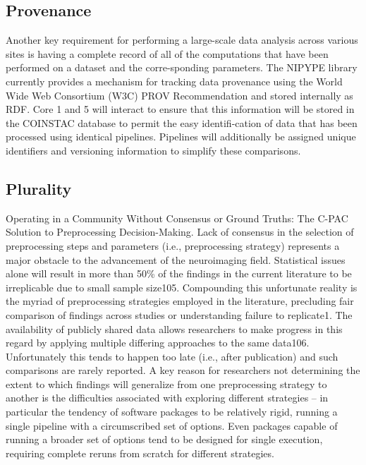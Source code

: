 \subsection{Provenance}
Another key requirement for performing a large-scale data analysis across various sites is having a complete record of all of the computations that have been performed on a dataset and the corre-sponding parameters. The NIPYPE library currently provides a mechanism for tracking data provenance using the World Wide Web Consortium (W3C) PROV Recommendation and stored internally as RDF. Core 1 and 5 will interact to ensure that this information will be stored in the COINSTAC database to permit the easy identifi-cation of data that has been processed using identical pipelines. Pipelines will additionally be assigned unique identifiers and versioning information to simplify these comparisons.



\subsection{Plurality}
\label{plurality}
Operating in a Community Without Consensus or Ground Truths: The C-PAC Solution to Preprocessing Decision-Making. Lack of consensus in the selection of preprocessing steps and parameters (i.e., preprocessing strategy) represents a major obstacle to the advancement of the neuroimaging field. Statistical issues alone will result in more than 50\% of the findings in the current literature to be irreplicable due to small sample size105. Compounding this unfortunate reality is the myriad of preprocessing strategies employed in the literature, precluding fair comparison of findings across studies or understanding failure to replicate1. The availability of publicly shared data allows researchers to make progress in this regard by applying multiple differing approaches to the same data106. Unfortunately this tends to happen too late (i.e., after publication) and such comparisons are rarely reported. A key reason for researchers not determining the extent to which findings will generalize from one preprocessing strategy to another is the difficulties associated with exploring different strategies – in particular the tendency of software packages to be relatively rigid, running a single pipeline with a circumscribed set of options. Even packages capable of running a broader set of options tend to be designed for single execution, requiring complete reruns from scratch for different strategies.

